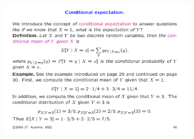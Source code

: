 \documentclass[notes=show,handout]{beamer}\usepackage[]{graphicx}\usepackage[]{color}
\newenvironment{stepitemize}{\begin{itemize}[<+->]}{\end{itemize} }
\begin{document}
\begin{frame}{\secname}
  \begin{example}
  \begin{figure}[ptb]\centering
  \includegraphics[width=0.9\textwidth,height=0.4\textheight]{img/ex_cond_audrins.pdf}
  \end{figure}
  \end{example}
\end{frame}

%
%
%
%
%
%
%
%
%
\end{document}
